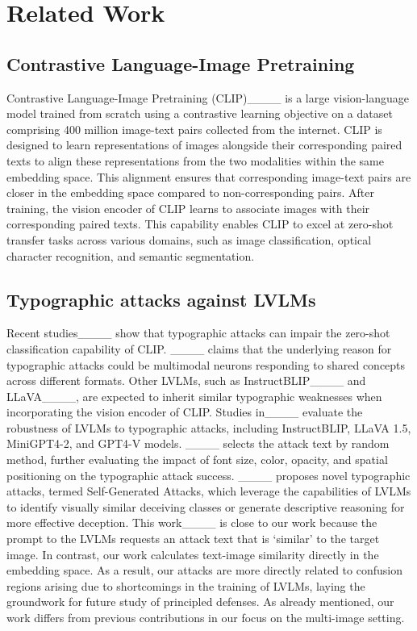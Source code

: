 \section{Related Work}
\subsection{Contrastive Language-Image Pretraining}
Contrastive Language-Image Pretraining (CLIP)____ is a large vision-language model trained from scratch using a contrastive learning objective on a dataset comprising 400 million image-text pairs collected from the internet. 
CLIP is designed to learn representations of images alongside their corresponding paired texts to align these representations from the two modalities within the same embedding space.
This alignment ensures that corresponding image-text pairs are closer in the embedding space compared to non-corresponding pairs.
After training, the vision encoder of CLIP learns to associate images with their corresponding paired texts. 
This capability enables CLIP to excel at zero-shot transfer tasks across various domains, such as image classification, optical character recognition, and semantic segmentation. 

\subsection{Typographic attacks against LVLMs}
Recent studies____ show that typographic attacks can impair the zero-shot classification capability of CLIP. 
____ claims that the underlying reason for typographic attacks could be multimodal neurons responding to shared concepts across different formats.
Other LVLMs, such as InstructBLIP____ and LLaVA____, are expected to inherit similar typographic weaknesses when incorporating the vision encoder of CLIP. 
Studies in____ evaluate the robustness of LVLMs to typographic attacks, including InstructBLIP, LLaVA 1.5, MiniGPT4-2, and GPT4-V models.
____ selects the attack text by random method, further evaluating the impact of font size, color, opacity, and spatial positioning on the typographic attack success.
____ proposes novel typographic attacks, termed Self-Generated Attacks, which leverage the capabilities of LVLMs to identify visually similar deceiving classes or generate descriptive reasoning for more effective deception.
This work____ is close to our work because the prompt to the LVLMs requests an attack text that is `similar' to the target image.
In contrast, our work calculates text-image similarity directly in the embedding space. 
As a result, our attacks are more directly related to confusion regions arising due to shortcomings in the training of LVLMs, laying the groundwork for future study of principled defenses.
As already mentioned, our work differs from previous contributions in our focus on the multi-image setting.



